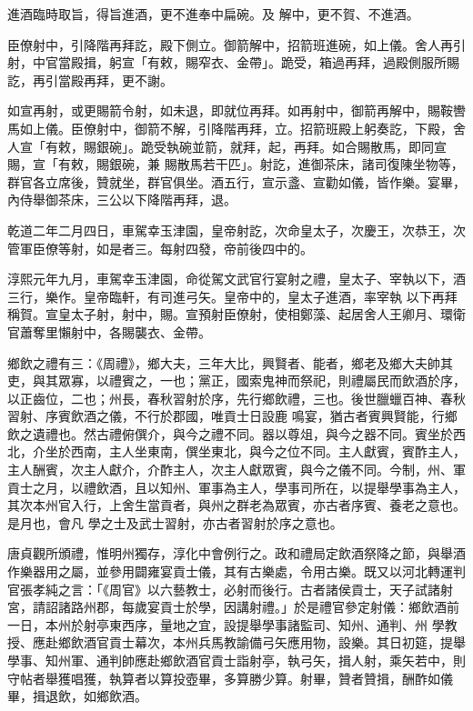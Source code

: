 \begin{pinyinscope}
 進酒臨時取旨，得旨進酒，更不進奉中扁碗。及
 解中，更不賀、不進酒。



 臣僚射中，引降階再拜訖，殿下側立。御箭解中，招箭班進碗，如上儀。舍人再引射，中官當殿揖，躬宣「有敕，賜窄衣、金帶」。跪受，箱過再拜，過殿側服所賜訖，再引當殿再拜，更不謝。



 如宣再射，或更賜箭令射，如未退，即就位再拜。如再射中，御箭再解中，賜鞍轡馬如上儀。臣僚射中，御箭不解，引降階再拜，立。招箭班殿上躬奏訖，下殿，舍人宣「有敕，賜銀碗」。跪受執碗並箭，就拜，起，再拜。如合賜散馬，即同宣賜，宣「有敕，賜銀碗，兼
 賜散馬若干匹」。射訖，進御茶床，諸司復陳坐物等，群官各立席後，贊就坐，群官俱坐。酒五行，宣示盞、宣勸如儀，皆作樂。宴畢，內侍舉御茶床，三公以下降階再拜，退。



 乾道二年二月四日，車駕幸玉津園，皇帝射訖，次命皇太子，次慶王，次恭王，次管軍臣僚等射，如是者三。每射四發，帝前後四中的。



 淳熙元年九月，車駕幸玉津園，命從駕文武官行宴射之禮，皇太子、宰執以下，酒三行，樂作。皇帝臨軒，有司進弓矢。皇帝中的，皇太子進酒，率宰執
 以下再拜稱賀。宣皇太子射，射中，賜。宣預射臣僚射，使相鄭藻、起居舍人王卿月、環衛官蕭奪里懶射中，各賜襲衣、金帶。



 鄉飲之禮有三：《周禮》，鄉大夫，三年大比，興賢者、能者，鄉老及鄉大夫帥其吏，與其眾寡，以禮賓之，一也；黨正，國索鬼神而祭祀，則禮屬民而飲酒於序，以正齒位，二也；州長，春秋習射於序，先行鄉飲禮，三也。後世臘蠟百神、春秋習射、序賓飲酒之儀，不行於郡國，唯貢士日設鹿
 鳴宴，猶古者賓興賢能，行鄉飲之遺禮也。然古禮俯僎介，與今之禮不同。器以尊俎，與今之器不同。賓坐於西北，介坐於西南，主人坐東南，僎坐東北，與今之位不同。主人獻賓，賓酢主人，主人酬賓，次主人獻介，介酢主人，次主人獻眾賓，與今之儀不同。今制，州、軍貢士之月，以禮飲酒，且以知州、軍事為主人，學事司所在，以提舉學事為主人，其次本州官入行，上舍生當貢者，與州之群老為眾賓，亦古者序賓、養老之意也。是月也，會凡
 學之士及武士習射，亦古者習射於序之意也。



 唐貞觀所頒禮，惟明州獨存，淳化中會例行之。政和禮局定飲酒祭降之節，與舉酒作樂器用之屬，並參用闢雍宴貢士儀，其有古樂處，令用古樂。既又以河北轉運判官張孝純之言：「《周官》以六藝教士，必射而後行。古者諸侯貢士，天子試諸射宮，請詔諸路州郡，每歲宴貢士於學，因講射禮。」於是禮官參定射儀：鄉飲酒前一日，本州於射亭東西序，量地之宜，設提舉學事諸監司、知州、通判、州
 學教授、應赴鄉飲酒官貢士幕次，本州兵馬教諭備弓矢應用物，設樂。其日初筵，提舉學事、知州軍、通判帥應赴鄉飲酒官貢士詣射亭，執弓矢，揖人射，乘矢若中，則守帖者舉獲唱獲，執算者以算投壺畢，多算勝少算。射畢，贊者贊揖，酬酢如儀畢，揖退飲，如鄉飲酒。




\end{pinyinscope}
